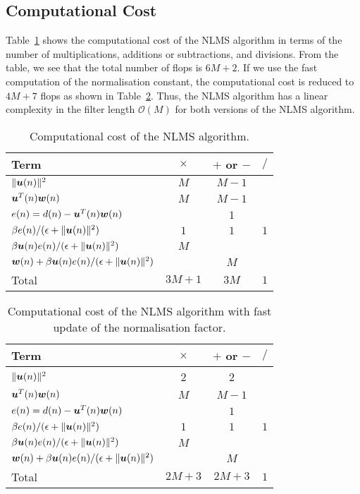 \subsection{Computational Cost}
Table~\ref{tab:comp_cost_nlms} shows the computational cost of the NLMS algorithm in terms of the number of multiplications, additions or subtractions, and divisions. From the table, we see that the total number of flops is $6M+2$. If we use the fast computation of the normalisation constant, the computational cost is reduced to $4M+7$ flops as shown in Table~\ref{tab:comp_cost_nlms_fast}. Thus, the NLMS algorithm has a linear complexity in the filter length $\mathcal{O}(M)$ for both versions of the NLMS algorithm.
\begin{table}[htbp]
  \centering
  \begin{tabular}{l c c c}
    \toprule
    Term & $\times$ & $+$ or $-$ & $/$ \\
    \midrule
    $\|\boldsymbol{u}(n)\|^2$ & $M$ & $M-1$ & \\
    $\boldsymbol{u}^T(n)\boldsymbol{w}(n)$ & $M$ & $M-1$ & \\
    $e(n)=d(n)-\boldsymbol{u}^T(n)\boldsymbol{w}(n)$ & & $1$ & \\
    $\beta e(n)/(\epsilon+\|\boldsymbol{u}(n)\|^2)$ & $1$ & $1$ & $1$\\
    $\beta\boldsymbol{u}(n)e(n)/(\epsilon+\|\boldsymbol{u}(n)\|^2)$ & $M$ & & \\
    $\boldsymbol{w}(n)+\beta \boldsymbol{u}(n)e(n)/(\epsilon+\|\boldsymbol{u}(n)\|^2)$ &  & $M$ &\\
    \midrule
    Total & $3M+1$ & $3M$ & $1$ \\
    \bottomrule
  \end{tabular}
  \caption{Computational cost of the NLMS algorithm.}
  \label{tab:comp_cost_nlms}
\end{table}
\begin{table}[htbp]
  \centering
  \begin{tabular}{l c c c}
    \toprule
    Term & $\times$ & $+$ or $-$ & $/$ \\
    \midrule
    $\|\boldsymbol{u}(n)\|^2$ & 2 & 2 & \\
    $\boldsymbol{u}^T(n)\boldsymbol{w}(n)$ & $M$ & $M-1$ & \\
    $e(n)=d(n)-\boldsymbol{u}^T(n)\boldsymbol{w}(n)$ & & $1$ & \\
    $\beta e(n)/(\epsilon+\|\boldsymbol{u}(n)\|^2)$ & $1$ & $1$ & $1$\\
    $\beta\boldsymbol{u}(n)e(n)/(\epsilon+\|\boldsymbol{u}(n)\|^2)$ & $M$ & & \\
    $\boldsymbol{w}(n)+\beta \boldsymbol{u}(n)e(n)/(\epsilon+\|\boldsymbol{u}(n)\|^2)$ &  & $M$ & \\
    \midrule
    Total & $2M+3$ & $2M+3$ & $1$ \\
    \bottomrule
  \end{tabular}
  \caption{Computational cost of the NLMS algorithm with fast update of the normalisation factor.}
  \label{tab:comp_cost_nlms_fast}
\end{table}

